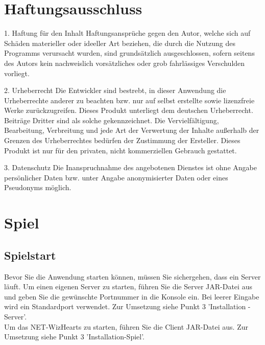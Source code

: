 \documentclass[titlepage,10pt,a4paper]{article}
\begin{document}
\section{Haftungsausschluss}

1. Haftung für den Inhalt
Haftungsansprüche gegen den Autor, welche sich auf Schäden materieller oder ideeller Art beziehen, die durch die Nutzung des Programms verursacht wurden, sind grundsätzlich ausgeschlossen, sofern seitens des Autors kein nachweislich vorsätzliches oder grob fahrlässiges Verschulden vorliegt.

2. Urheberrecht
Die Entwickler sind bestrebt, in dieser Anwendung die Urheberrechte anderer zu beachten bzw. nur auf selbst erstellte sowie lizenzfreie Werke zurückzugreifen.
Dieses Produkt unterliegt dem deutschen Urheberrecht. Beiträge Dritter sind als solche gekennzeichnet. Die Vervielfältigung, Bearbeitung, Verbreitung und jede Art der Verwertung der Inhalte außerhalb der Grenzen des Urheberrechtes bedürfen der Zustimmung der Ersteller. Dieses Produkt ist  nur für den privaten, nicht kommerziellen Gebrauch gestattet.

3. Datenschutz
Die Inanspruchnahme des angebotenen Dienstes ist ohne Angabe persönlicher Daten bzw. unter Angabe anonymisierter Daten oder eines Pseudonyms möglich.
\\

\section{Spiel}
\subsection{Spielstart}
Bevor Sie die Anwendung starten können, müssen Sie sichergehen, dass ein \gls{Server} läuft. Um einen eigenen \gls{Server} zu starten, führen Sie die \gls{Server} JAR-Datei aus und geben Sie die gewünschte Portnummer in die Konsole ein. Bei leerer Eingabe wird ein Standardport verwendet. Zur Umsetzung siehe Punkt 3 'Installation - Server'. \\
Um das NET-WizHearts zu starten, führen Sie die Client JAR-Datei aus.  Zur Umsetzung siehe Punkt 3 'Installation-Spiel'.\\
\end{document}
